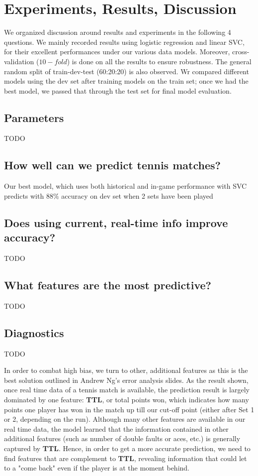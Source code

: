 \documentclass[paper=a4, fontsize=10pt]{scrartcl} %
\numberwithin{equation}{section} %
\numberwithin{figure}{section} %
\numberwithin{table}{section} %
\begin{document}

\section{Experiments, Results, Discussion}
We organized discussion around results and experiments in the following 4 questions. We mainly recorded results using logistic regression and linear SVC, for their excellent performances under our various data models. Moreover, cross-validation ($10-fold$) is done on all the results to ensure robustness. The general random split of train-dev-test (60:20:20) is also observed. Wr compared different models using the dev set after training models on the train set; once we had the best model, we passed that through the test set for final model evaluation. 
\subsection{Parameters}
TODO
\subsection{How well can we predict tennis matches?}
Our best model, which uses both historical and in-game performance with SVC predicts with $88\%$ accuracy on dev set when 2 sets have been played
\subsection{Does using current, real-time info improve accuracy?}
TODO
\subsection{What features are the most predictive?}
TODO
\subsection{Diagnostics}
TODO

In order to combat high bias, we turn to other, additional features as this is the best solution outlined in Andrew Ng's error analysis slides. As the result shown, once real time data of a tennis match is available, the prediction result is largely dominated by one feature: \textbf{TTL}, or total points won, which indicates how many points one player has won in the match up till our cut-off point (either after Set 1 or 2, depending on the run). Although many other features are available in our real time data, the model learned that the information contained in other additional features (such as number of double faults or aces, etc.) is generally captured by \textbf{TTL}.  Hence, in order to get a more accurate prediction, we need to find features that are complement to \textbf{TTL}, revealing information that could let to a "come back" even if the player is at the moment behind.
 
\end{document}
